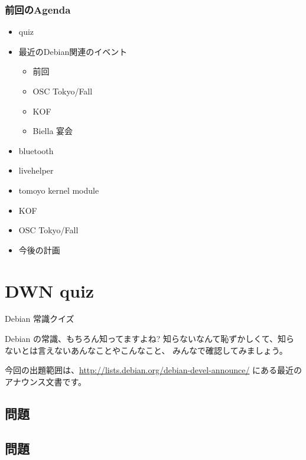 \documentclass[cjk,dvipdfmx,12pt]{beamer}
\begin{document}
\begin{frame}
 \frametitle{前回のAgenda}
\begin{minipage}[t]{0.45\hsize}
  \begin{itemize}
  \item quiz
  \item 最近のDebian関連のイベント
	\begin{itemize}
	 \item 前回
	 \item OSC Tokyo/Fall
	 \item KOF
	 \item Biella 宴会
	\end{itemize}
 \end{itemize}
\end{minipage}
\begin{minipage}[t]{0.45\hsize}
 \begin{itemize}
  \item bluetooth
  \item livehelper
  \item tomoyo kernel module
  \item KOF
  \item OSC Tokyo/Fall
  \item 今後の計画
 \end{itemize}
\end{minipage}
\end{frame}

\section{DWN quiz}
\begin{frame}{Debian 常識クイズ}

Debian の常識、もちろん知ってますよね?
知らないなんて恥ずかしくて、知らないとは言えないあんなことやこんなこと、
みんなで確認してみましょう。

今回の出題範囲は、\url{http://lists.debian.org/debian-devel-announce/} にある最近の
アナウンス文書です。

\end{frame}




\subsection{問題}


 \subsection{問題}
\end{document}
